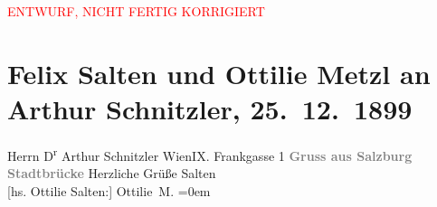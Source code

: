 
\begin{center}
            \textcolor{red}{ENTWURF, NICHT FERTIG KORRIGIERT}
                      \end{center}
            
         \renewcommand{\erwaehnteOrte}{Orte: Frankgasse, IX., Alsergrund, Salzburg, Staatsbrücke, Wien}
         \renewcommand{\erwaehnteWerke}{}
               \section[Felix Salten und Ottilie Metzl an Arthur Schnitzler, 25. 12. 1899]{ Felix Salten und Ottilie Metzl an Arthur Schnitzler,
               25. 12. 1899}\nopagebreak{}\rehead{ }\begin{ledgroupsized}[t]{13cm}\normalsize\beginnumbering \toendnotes[C]{\smallbreak\pagebreak[2]} 
\pstart{}{\pb}Herrn D\textsuperscript{r} Arthur Schnitzler \pend{}\pstart{}Wien\pend{}\pstart{}IX. Frankgasse 1\pend{}{\bigskip}\pstart
           \noindent{}\centering{}{\pb}\textcolor{gray}{\textbf{Gruss aus Salzburg}}\pend
           \pstart
           \noindent{}\centering{}\textcolor{gray}{\textbf{Stadtbrücke}}\pend
           \pstart
           Herzliche Grüße\pend
           \pstart
           \spacefill\mbox{Salten}{\\[\baselineskip]}{[}hs. Ottilie Salten:{]} \spacefill\mbox{Ottilie M.}\pend
           \leftskip=0em{}
         
         \endnumbering{}\end{ledgroupsized}\begin{anhang}\end{anhang}\newcommand{\dateiname}{L03303}\newcommand{\titel}{Felix Salten und Ottilie Metzl an Arthur Schnitzler, 25. 12. 1899}\newcommand{\editorInnen}{Martin Anton Müller und Laura Untner}
      